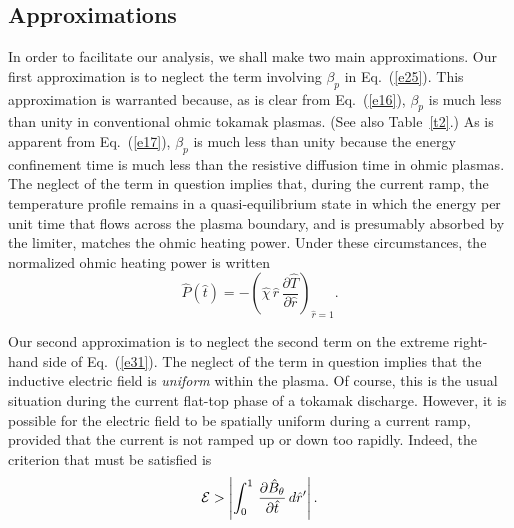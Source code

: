 \documentclass{iopjournal}
\begin{document}
\subsection{Approximations}
In order to facilitate our analysis, we shall make two main approximations. 
Our first approximation is to neglect the term involving $\beta_p$ in Eq.~(\ref{e25}).
This approximation is warranted because, as is clear from Eq.~(\ref{e16}), $\beta_p$ is much less than unity in  conventional ohmic
tokamak plasmas. (See also Table~\ref{t2}.) As is apparent from Eq.~(\ref{e17}), $\beta_p$ is much less than unity because the energy confinement time is much less than
the resistive diffusion time in ohmic plasmas. The neglect of the term in question implies that, during the current ramp,  the temperature profile remains in a quasi-equilibrium state in which
the energy per unit time that flows across the plasma boundary, and is presumably absorbed by the limiter, matches the ohmic heating power. Under these
circumstances, the normalized ohmic heating power is written
\begin{equation}\label{e36}
\hat{P}(\hat{t}) = - \left(\hat{\chi}\,\hat{r}\,\frac{\partial\hat{T}}{\partial\hat{r}}\right)_{\hat{r}=1}.
\end{equation}

Our second approximation is to neglect the second term on the extreme right-hand side of Eq.~(\ref{e31}). The neglect of the term in question implies that
the inductive electric field is {\em uniform}\/ within the plasma. Of course, this is the usual situation during the current flat-top phase of a tokamak
discharge. However, it is possible for the electric field to be spatially uniform during a current ramp, provided that the current is not ramped up or down too
rapidly. Indeed, the criterion that must be satisfied is
\begin{equation}\label{e35}
{\cal E} >\left| \int_0^{1}\,\frac{\partial\hat{B}_\theta}{\partial\hat{t}}\,d\hat{r}'\right|.
\end{equation}
\end{document}
